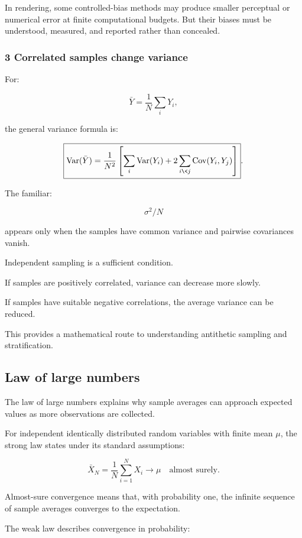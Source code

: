 In rendering, some controlled-bias methods may produce smaller perceptual or numerical error at finite computational budgets. But their biases must be understood, measured, and reported rather than concealed.

\subsubsection{3 Correlated samples change variance}\label{02-foundations-ii-ch030-correlated-samples-change-variance}

For:

\[
 \bar Y=\frac1N\sum_iY_i,
\]

the general variance formula is:

\[
 \boxed{ \operatorname{Var}(\bar Y) = \frac1{N^2} \left[ \sum_i\operatorname{Var}(Y_i) + 2\sum_{i\<j}\operatorname{Cov}(Y_i,Y_j) \right] }.
\]

The familiar:

\[
 \sigma^2/N
\]

appears only when the samples have common variance and pairwise covariances vanish.

Independent sampling is a sufficient condition.

If samples are positively correlated, variance can decrease more slowly.

If samples have suitable negative correlations, the average variance can be reduced.

This provides a mathematical route to understanding antithetic sampling and stratification.

\subsection{Law of large numbers}\label{02-foundations-ii-ch030-law-of-large-numbers}

The law of large numbers explains why sample averages can approach expected values as more observations are collected.

For independent identically distributed random variables with finite mean \(\mu\), the strong law states under its standard assumptions:

\[
 \boxed{ \bar X_N= \frac1N\sum_{i=1}^NX_i \longrightarrow\mu \quad\text{almost surely} }.
\]

Almost-sure convergence means that, with probability one, the infinite sequence of sample averages converges to the expectation.

The weak law describes convergence in probability:

